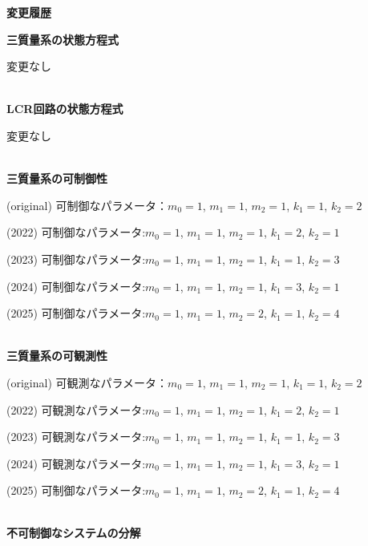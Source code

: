 



\begin{center}
	{\Large \bf 変更履歴}
\end{center}
	

\noindent
{\bf 三質量系の状態方程式}

変更なし

\ \\ \noindent
{\bf LCR回路の状態方程式}

変更なし

\ \\ \noindent
{\bf 三質量系の可制御性}

(original) 可制御なパラメータ：$m_0=1$, $m_1=1$, $m_2=1$, $k_1=1$, $k_2=2$

(2022) 可制御なパラメータ:$m_0=1$, $m_1=1$, $m_2=1$, {\color{red} $k_1=2$, $k_2=1$}

(2023) 可制御なパラメータ:$m_0=1$, $m_1=1$, $m_2=1$, $k_1=1$, {\color{red} $k_2=3$}

(2024) 可制御なパラメータ:$m_0=1$, $m_1=1$, $m_2=1$, {\color{red} $k_1=3$, $k_2=1$}

(2025) 可制御なパラメータ:$m_0=1$, $m_1=1$, {\color{red} $m_2=2$}, $k_1=1$, {\color{red} $k_2=4$}

\ \\ \noindent
{\bf 三質量系の可観測性}

(original) 可観測なパラメータ：$m_0=1$, $m_1=1$, $m_2=1$, $k_1=1$, $k_2=2$

(2022) 可観測なパラメータ:$m_0=1$, $m_1=1$, $m_2=1$, {\color{red} $k_1=2$, $k_2=1$}

(2023) 可観測なパラメータ:$m_0=1$, $m_1=1$, $m_2=1$, $k_1=1$, {\color{red} $k_2=3$}

(2024) 可観測なパラメータ:$m_0=1$, $m_1=1$, $m_2=1$, {\color{red} $k_1=3$, $k_2=1$}

(2025) 可制御なパラメータ:$m_0=1$, $m_1=1$, {\color{red} $m_2=2$}, $k_1=1$, {\color{red} $k_2=4$}

\ \\ \noindent
{\bf 不可制御なシステムの分解}

